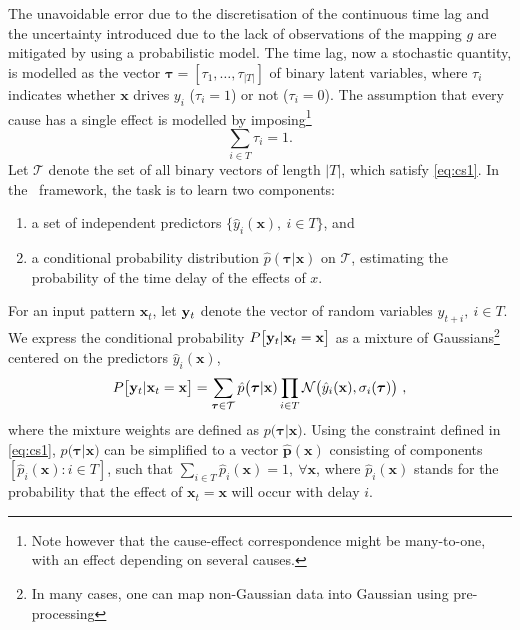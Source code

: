The unavoidable error due to the discretisation of the continuous time lag and the uncertainty 
introduced due to the lack of observations of the mapping $g$ are mitigated by using a 
probabilistic model. The time lag, now a stochastic quantity, is modelled as the vector 
$\boldsymbol{\tau} = [\tau_1, \dots, \tau_{\rvert T \rvert}]$ of binary latent variables, 
where $\tau_i$ indicates whether $\mathbf{x}$ drives $y_i$ ($\tau_i=1$) or not ($\tau_i=0$). The 
assumption that every cause has a single effect is modelled by imposing\footnote{Note however 
that the cause-effect correspondence might be many-to-one, with an effect depending on several 
causes.}
%
\begin{equation}\label{eq:cs1}
\sum_{i \in T} \tau_i = 1.
\end{equation}
%
Let $\mathcal{T}$ denote the set of all binary vectors of length $\rvert T \rvert$, which satisfy 
\cref{eq:cs1}. In the \XX \ framework, the task is to learn two components: 
\begin{enumerate}
  \item a set of independent predictors $\{\hat y_i(\mathbf{x}),\ i \in T\}$, and
  \item a conditional probability distribution $\hat p(\boldsymbol{\tau} \rvert \mathbf{x})$ on 
        $\mathcal{T}$, estimating the probability of the time delay of the effects of $x$.
\end{enumerate} 
%
For an input pattern $\mathbf{x}_t$, let ${\bf y}_t$ denote the vector of random variables 
$y_{t+i},\ i \in T$. We express the conditional probability $P\bigl[{\bf y}_{t}\vert \mathbf{x}_t=\mathbf{x}\bigr]$ 
as a mixture of Gaussians\footnote{In many cases, one can map non-Gaussian data 
into Gaussian using pre-processing} centered on the predictors 
$\hat y_i(\mathbf{x})$, 
%
\begin{equation}\label{eq:py}
  P\bigl[{\bf y}_{t}\vert \mathbf{x}_t=\mathbf{x}\bigr] = 
  \sum_{\boldsymbol{\tau}\in \mathcal{T}} \hat p\bigl(\boldsymbol{\tau}\vert \mathbf{x}) 
  \prod_{i\in T} {\cal N}\bigl(\hat y_i(\mathbf{x}),\sigma_i(\boldsymbol{\tau})\bigr) \ ,
\end{equation}
%
where the mixture weights are defined as $p\bigl(\boldsymbol{\tau}\vert \mathbf{x})$. Using the constraint 
defined in \cref{eq:cs1}, $p\bigl(\boldsymbol{\tau}\vert \mathbf{x})$ can be simplified to a vector 
$\hat{\mathbf{p}}(\mathbf{x})$ consisting of components $[\hat p_i(\mathbf{x}): i \in T]$, such that 
$\sum_{i \in T}{\hat p_i(\mathbf{x})} = 1,\ \forall \mathbf{x}$, where $\hat p_i(\mathbf{x})$ stands for the 
probability that the effect of $\mathbf{x}_t=\mathbf{x}$ will occur with delay $i$.

